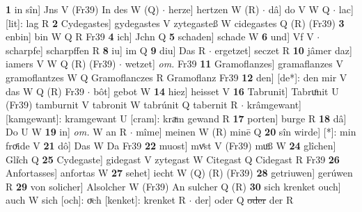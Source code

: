 \documentclass[8pt,a4paper,notitlepage]{article}
\begin{document}
\begin{table}[ht]
\begin{minipage}[t]{0.5\linewidth}
\textbf{1} in sîn] Jns V (Fr39) In des W (Q)  $\cdot$ herze] hertzen W (R)  $\cdot$ dâ] do V W Q  $\cdot$ lac] [lit]: lag R \textbf{2} Cydegastes] gydegastes V zytegasteß W cidegastes Q (R) (Fr39) \textbf{3} enbin] bin W Q R Fr39 \textbf{4} ich] Jchn Q \textbf{5} schaden] schade W \textbf{6} und] Vf V  $\cdot$ scharpfe] scharpffen R \textbf{8} iu] im Q \textbf{9} diu] Das R  $\cdot$ ergetzet] seczet R \textbf{10} jâmer daz] iamers V W Q (R) (Fr39)  $\cdot$ wetzet] \textit{om.} Fr39 \textbf{11} Gramoflanzes] gramaflanzes V gramoflantzes W Q Gramoflanczes R Gramoflanz Fr39 \textbf{12} den] [de*]: den mir V das W Q (R) Fr39  $\cdot$ bôt] gebot W \textbf{14} hiez] heisset V \textbf{16} Tabrunit] Tabruͦnit U (Fr39) tamburnit V tabronit W tabrúnit Q tabernit R  $\cdot$ krâmgewant] [kamgewant]: kramgewant U [cram]: kraͮm gewand R \textbf{17} porten] burge R \textbf{18} dâ] Do U W \textbf{19} in] \textit{om.} W an R  $\cdot$ mîme] meinen W (R) minē Q \textbf{20} sîn wirde] [*]: min froͤide V \textbf{21} dô] Das W Da Fr39 \textbf{22} muost] mvͤst V (Fr39) muͦß W \textbf{24} glîchen] Gli͑ch Q \textbf{25} Cydegaste] gidegast V zytegast W Citegast Q Cidegast R Fr39 \textbf{26} Anfortasses] anfortas W \textbf{27} sehet] iecht W (Q) (R) (Fr39) \textbf{28} getriuwen] gerúwen R \textbf{29} von solicher] Alsolcher W (Fr39) An sulcher Q (R) \textbf{30} sich krenket ouch] auch W sich [och]: oͮch [kenket]: krenket R  $\cdot$ der] oder Q \sout{oder} der R \newline
\end{minipage}
\end{table}
\end{document}
